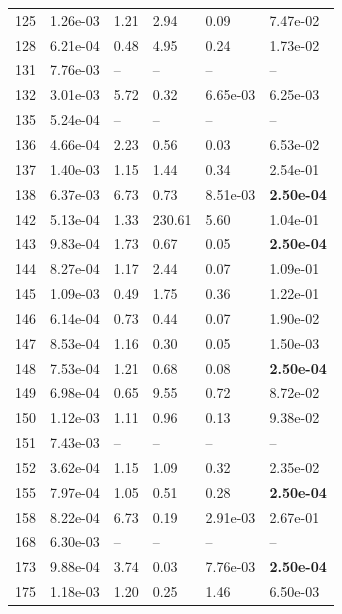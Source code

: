 \begin{figure}[htbp!]
{\begin{minipage}[t]{0.48\linewidth}
\begin{tabular}{llllll}
        \midrule
                    125 & 1.26e-03 & 1.21 & 2.94 & 0.09 & 7.47e-02\\
                    128 & 6.21e-04 & 0.48 & 4.95 & 0.24 & 1.73e-02\\
                    131 & 7.76e-03 & -- & -- & -- & --\\
                    132 & 3.01e-03 & 5.72 & 0.32 & 6.65e-03 & 6.25e-03\\
                    135 & 5.24e-04 & -- & -- & -- & --\\
                    136 & 4.66e-04 & 2.23 & 0.56 & 0.03 & 6.53e-02\\
                    137 & 1.40e-03 & 1.15 & 1.44 & 0.34 & 2.54e-01\\
                    138 & 6.37e-03 & 6.73 & 0.73 & 8.51e-03 & \textbf{2.50e-04}\\
                    142 & 5.13e-04 & 1.33 & 230.61 & 5.60 & 1.04e-01\\
                    143 & 9.83e-04 & 1.73 & 0.67 & 0.05 & \textbf{2.50e-04}\\
                    144 & 8.27e-04 & 1.17 & 2.44 & 0.07 & 1.09e-01\\
                    145 & 1.09e-03 & 0.49 & 1.75 & 0.36 & 1.22e-01\\
                    146 & 6.14e-04 & 0.73 & 0.44 & 0.07 & 1.90e-02\\
                    147 & 8.53e-04 & 1.16 & 0.30 & 0.05 & 1.50e-03\\
                    148 & 7.53e-04 & 1.21 & 0.68 & 0.08 & \textbf{2.50e-04}\\
                    149 & 6.98e-04 & 0.65 & 9.55 & 0.72 & 8.72e-02\\
                    150 & 1.12e-03 & 1.11 & 0.96 & 0.13 & 9.38e-02\\
                    151 & 7.43e-03 & -- & -- & -- & --\\
                    152 & 3.62e-04 & 1.15 & 1.09 & 0.32 & 2.35e-02\\
                    155 & 7.97e-04 & 1.05 & 0.51 & 0.28 & \textbf{2.50e-04}\\
                    158 & 8.22e-04 & 6.73 & 0.19 & 2.91e-03 & 2.67e-01\\
                    168 & 6.30e-03 & -- & -- & -- & --\\
                    173 & 9.88e-04 & 3.74 & 0.03 & 7.76e-03 & \textbf{2.50e-04}\\
                    175 & 1.18e-03 & 1.20 & 0.25 & 1.46 & 6.50e-03\\

\end{tabular}
\end{minipage}}
\end{figure}

